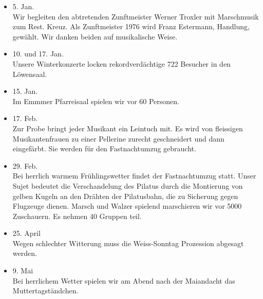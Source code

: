 \begin{history}


    \begin{itemize}

        \item[]5. Jan.\\
        Wir begleiten den abtretenden Zunftmeister Werner Troxler mit
        Marschmusik zum Rest. Kreuz. Als Zunftmeister 1976 wird Franz Estermann,
        Handlung, gewählt. Wir danken beiden auf musikalische Weise.

        \item[]10. und 17. Jan.\\
        Unsere Winterkonzerte locken rekordverdächtige 722 Besucher in den
        Löwensaal.

        \item[]15. Jan.\\
        Im Emmmer Pfarreisaal spielen wir vor 60 Personen.

        \item[]17. Feb.\\
        Zur Probe bringt jeder Musikant ein Leintuch mit. Es wird von fleissigen
        Musikantenfrauen zu einer Pellerine zurecht geschneidert und dann
        eingefärbt. Sie werden für den Fastnachtumzug gebraucht.

        \item[]29. Feb.\\
        Bei herrlich warmem Frühlingswetter findet der Fastnachtumzug statt.
        Unser Sujet bedeutet die Verschandelung des Pilatus durch die Montierung
        von gelben Kugeln an den Drähten der Pilatusbahn, die zu Sicherung gegen
        Flugzeuge dienen. Marsch und Walzer spielend marschieren wir vor 5000
        Zuschauern. Es nehmen 40 Gruppen teil.

        \item[]25. April\\
        Wegen schlechter Witterung muss die Weiss-Sonntag Prozession abgesagt
        werden.

        \item[]9. Mai\\
        Bei herrlichem Wetter spielen wir am Abend nach der Maiandacht das
        Muttertagständchen.


\end{itemize}
\end{history}
